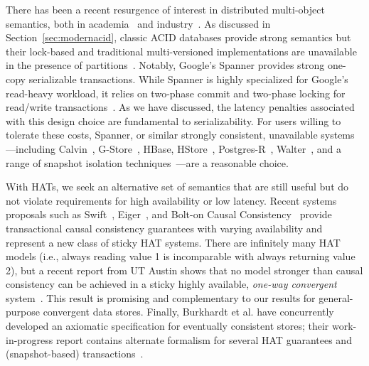 There has been a recent resurgence of interest in distributed
multi-object semantics, both in academia~\cite{kraska-s3, gstore,
  eiger, walter,calvin, swift} and industry~\cite{spanner}. As
discussed in Section~\ref{sec:modernacid}, classic ACID databases
provide strong semantics but their lock-based and traditional
multi-versioned implementations are unavailable in the presence of
partitions~\cite{bernstein-book, gray-isolation}. Notably, Google's
Spanner provides strong one-copy serializable transactions. While
Spanner is highly specialized for Google's read-heavy workload, it
relies on two-phase commit and two-phase locking for read/write
transactions~\cite{spanner}. As we have discussed, the latency
penalties associated with this design choice are fundamental to
serializability. For users willing to tolerate these costs, Spanner,
or similar strongly consistent, unavailable systems---including
Calvin~\cite{calvin}, G-Store~\cite{gstore}, HBase, HStore~\cite{hstore}, Postgres-R~\cite{kemme-thesis},
Walter~\cite{walter}, and a range of snapshot isolation
techniques~\cite{daudjee-snapshot}---are a reasonable choice.

With HATs, we seek an alternative set of semantics that are still
useful but do not violate requirements for high availability or low
latency. Recent systems proposals such as Swift~\cite{swift},
Eiger~\cite{eiger}, and Bolt-on Causal Consistency~\cite{bolton}
provide transactional causal consistency guarantees with varying
availability and represent a new class of sticky HAT systems. There
are infinitely many HAT models (i.e., always reading value 1 is
incomparable with always returning value 2), but a recent report from
UT Austin shows that no model stronger than causal consistency can be
achieved in a sticky highly available, \textit{one-way convergent}
system~\cite{cac}. This result is promising and complementary to our
results for general-purpose convergent data stores. Finally, Burkhardt
et al. have concurrently developed an axiomatic specification for
eventually consistent stores; their work-in-progress report contains
alternate formalism for several HAT guarantees and (snapshot-based)
transactions~\cite{burkhardt-txns}.







